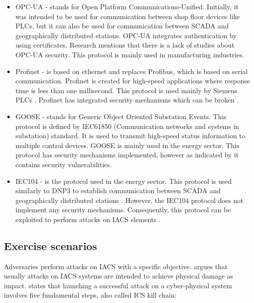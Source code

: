 \begin{itemize}
	
	\item OPC-UA - stands for Open Platform Communications-Unified. Initially, it was intended to be used for communication between shop floor devices like PLCs, but it can also be used for communication between SCADA and geographically distributed stations. OPC-UA integrates authentication by using certificates. Research \parencite{102-opc-ua-security} mentions that there is a lack of studies about OPC-UA security. This protocol is mainly used in manufacturing industries. 

	
	\item Profinet - is based on ethernet and replaces Profibus, which is based on serial communication. Profinet is created for high-speed applications where response time is less than one millisecond. This protocol is used mainly by Siemens PLCs \parencite{104-profint-documentation}. Profinet has integrated security mechanisms which can be broken \parencite{103-profinet-security}.
	
	\item GOOSE - stands for Generic Object Oriented Substation Events.  This protocol is defined by IEC61850 (Communication networks and systems in substation) standard. It is used to transmit high-speed status information to multiple control devices.  GOOSE is mainly used in the energy sector. This protocol has security mechanisms implemented, however as indicated by \parencite{105-goose-security} it contains security vulnerabilities.
	
	\item IEC104 - is the protocol used in the energy sector. This protocol is used similarly to DNP3 to establish communication between SCADA and geographically distributed stations \parencite{104-iec104-scada-atack}. However, the IEC104 protocol does not implement any security mechanisms. Consequently, this protocol can be exploited to perform attacks on IACS elements \parencite{106-iec014-sec-bb}.
\end{itemize}


\subsection{Exercise scenarios} \label{subsec:excersise-scenarios}

Adversaries perform attacks on IACS with a specific objective. \citeauthor{20-dsign-and-realization-of-testbeds} \parencite{20-dsign-and-realization-of-testbeds} argues that usually attacks on IACS systems are intended to achieve physical damage as impact. \citeauthor{28-testbed-road-infra} \parencite{28-testbed-road-infra} states that launching a successful attack on a cyber-physical system involves five fundamental steps, also called ICS kill chain:

